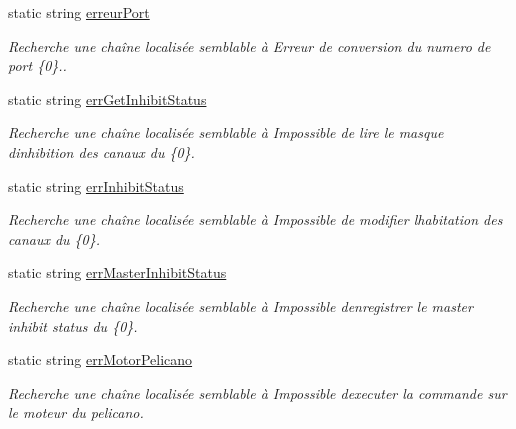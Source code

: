 \begin{DoxyCompactItemize}
static string \mbox{\hyperlink{class_device_library_1_1messages_text_a54b35fb372930fed5dc13a77e060396c}{erreur\+Port}}
\begin{DoxyCompactList}\small\item\em Recherche une chaîne localisée semblable à Erreur de conversion du numero de port \{0\}.. \end{DoxyCompactList}\item 
static string \mbox{\hyperlink{class_device_library_1_1messages_text_aa59ba4427bc96cde7bd3f125a279f09c}{err\+Get\+Inhibit\+Status}}
\begin{DoxyCompactList}\small\item\em Recherche une chaîne localisée semblable à Impossible de lire le masque d\textquotesingle{}inhibition des canaux du \{0\}. \end{DoxyCompactList}\item 
static string \mbox{\hyperlink{class_device_library_1_1messages_text_a56487b103b700f2efc304a3ab0a75d1a}{err\+Inhibit\+Status}}
\begin{DoxyCompactList}\small\item\em Recherche une chaîne localisée semblable à Impossible de modifier l\textquotesingle{}habitation des canaux du \{0\}. \end{DoxyCompactList}\item 
static string \mbox{\hyperlink{class_device_library_1_1messages_text_ad9c4ce7df2d9a97fb037a6b2fe1a01fe}{err\+Master\+Inhibit\+Status}}
\begin{DoxyCompactList}\small\item\em Recherche une chaîne localisée semblable à Impossible d\textquotesingle{}enregistrer le master inhibit status du \{0\}. \end{DoxyCompactList}\item 
static string \mbox{\hyperlink{class_device_library_1_1messages_text_a457477e9ee134856647bf051d74293ea}{err\+Motor\+Pelicano}}
\begin{DoxyCompactList}\small\item\em Recherche une chaîne localisée semblable à Impossible d\textquotesingle{}executer la commande sur le moteur du pelicano. \end{DoxyCompactList}\item 

\end{DoxyCompactItemize}
